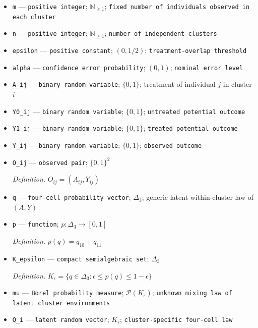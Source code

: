 \documentclass{article}
\begin{document}
\begin{itemize}
  \item \texttt{m} --- \texttt{positive integer}; \(\mathbb N_{\ge 1}\); \texttt{fixed number of individuals observed in each cluster}
  \item \texttt{n} --- \texttt{positive integer}; \(\mathbb N_{\ge 1}\); \texttt{number of independent clusters}
  \item \texttt{epsilon} --- \texttt{positive constant}; \((0,1/2)\); \texttt{treatment-\allowbreak{}overlap threshold}
  \item \texttt{alpha} --- \texttt{confidence error probability}; \((0,1)\); \texttt{nominal error level}
  \item \texttt{A\_\allowbreak{}ij} --- \texttt{binary random variable}; \(\{0,1\}\); treatment of individual \(j\) in cluster \(i\)
  \item \texttt{Y0\_\allowbreak{}ij} --- \texttt{binary random variable}; \(\{0,1\}\); \texttt{untreated potential outcome}
  \item \texttt{Y1\_\allowbreak{}ij} --- \texttt{binary random variable}; \(\{0,1\}\); \texttt{treated potential outcome}
  \item \texttt{Y\_\allowbreak{}ij} --- \texttt{binary random variable}; \(\{0,1\}\); \texttt{observed outcome}
  \item \texttt{O\_\allowbreak{}ij} --- \texttt{observed pair}; \(\{0,1\}^2\)
  \par\smallskip\noindent\emph{Definition.} \(O_{ij}=(A_{ij},Y_{ij})\)
  \item \texttt{q} --- \texttt{four-\allowbreak{}cell probability vector}; \(\Delta_3\); generic latent within-cluster law of \((A,Y)\)
  \item \texttt{p} --- \texttt{function}; \(p:\Delta_3\to[0,1]\)
  \par\smallskip\noindent\emph{Definition.} \(p(q)=q_{10}+q_{11}\)
  \item \texttt{K\_\allowbreak{}epsilon} --- \texttt{compact semialgebraic set}; \(\Delta_3\)
  \par\smallskip\noindent\emph{Definition.} \(K_{\epsilon}=\{q\in\Delta_3:\epsilon\le p(q)\le1-\epsilon\}\)
  \item \texttt{mu} --- \texttt{Borel probability measure}; \(\mathcal P(K_{\epsilon})\); \texttt{unknown mixing law of latent cluster environments}
  \item \texttt{Q\_\allowbreak{}i} --- \texttt{latent random vector}; \(K_{\epsilon}\); \texttt{cluster-\allowbreak{}specific four-\allowbreak{}cell law}

\end{itemize}
\end{document}
